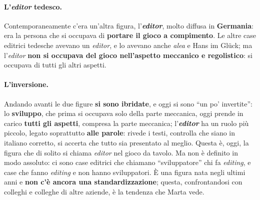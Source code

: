 \paragraph{L'\emph{editor} tedesco.} Contemporaneamente c'era un'altra figura,
l'\textbf{\emph{editor}}, molto diffusa in \textbf{Germania}: era la persona che si
occupava di \textbf{portare il gioco a compimento}. Le altre case editrici tedesche avevano
un \emph{editor}, e lo avevano anche \emph{alea} e Hans im Glück; ma l'\emph{editor}
\textbf{non si occupava del gioco nell'aspetto meccanico e regolistico}: si occupava di
tutti gli altri aspetti.

\paragraph{L'inversione.} Andando avanti le due figure \textbf{si sono ibridate}, e oggi si
sono ``un po' invertite'': lo \textbf{sviluppo}, che prima si occupava solo della parte
meccanica, oggi prende in carico \textbf{tutti gli aspetti}, compresa la parte meccanica;
l'\textbf{\emph{editor}} ha un ruolo più piccolo, legato soprattutto \textbf{alle parole}:
rivede i testi, controlla che siano in italiano corretto, si accerta che tutto sia
presentato al meglio. Questa è, oggi, la figura che di solito si chiama \emph{editor} nel
gioco da tavolo. Ma non è definito in modo assoluto: ci sono case editrici che chiamano
``sviluppatore'' chi fa \emph{editing}, e case che fanno \emph{editing} e non hanno
sviluppatori. È una figura nata negli ultimi anni e \textbf{non c'è ancora una
standardizzazione}; questa, confrontandosi con colleghi e colleghe di altre aziende, è la
tendenza che Marta vede.

